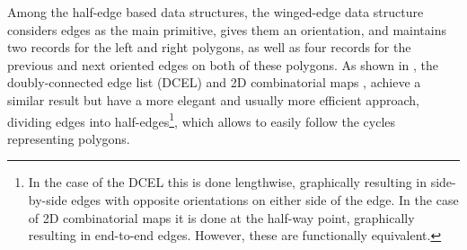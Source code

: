 Among the half-edge based data structures, the winged-edge data structure \citep{Baumgart75} considers edges as the main primitive, gives them an orientation, and maintains two records for the left and right polygons, as well as four records for the previous and next oriented edges on both of these polygons.
As shown in , the doubly-connected edge list (DCEL) \citep{Muller78} and 2D combinatorial maps \citep{Edmonds60}, achieve a similar result but have a more elegant and usually more efficient approach, dividing edges into half-edges\footnote{In the case of the DCEL this is done lengthwise, graphically resulting in side-by-side edges with opposite orientations on either side of the edge. In the case of 2D combinatorial maps it is done at the half-way point, graphically resulting in end-to-end edges. However, these are functionally equivalent.}, which allows to easily follow the cycles representing polygons.
